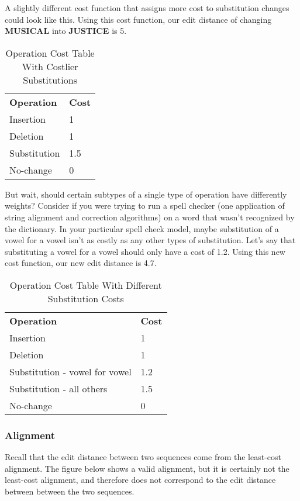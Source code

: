A slightly different cost function that assigns more cost to substitution changes could look like this. Using this cost function, our edit distance of changing \textbf{MUSICAL} into \textbf{JUSTICE} is 5.
\begin{table}[!h]
\centering
\begin{tabular}{ll}
\textbf{Operation} & \textbf{Cost} \\
Insertion          & 1             \\
Deletion           & 1             \\
Substitution       & 1.5             \\
No-change          & 0            
\end{tabular}
\caption{Operation Cost Table With Costlier Substitutions}
\label{tab:naivetable2}
\end{table}

But wait, should certain subtypes of a single type of operation have differently weights? Consider if you were trying to run a spell checker (one application of string alignment and correction algorithms) on a word that wasn't recognized by the dictionary. In your particular spell check model, maybe substitution of a vowel for a vowel isn't as costly as any other types of substitution. Let's say that substituting a vowel for a vowel should only have a cost of 1.2. Using this new cost function, our new edit distance is 4.7.
\begin{table}[!h]
\centering
\begin{tabular}{ll}
\textbf{Operation}             & \textbf{Cost} \\
Insertion                      & 1             \\
Deletion                       & 1             \\
Substitution - vowel for vowel & 1.2           \\
Substitution - all others      & 1.5           \\
No-change                      & 0                
\end{tabular}
\caption{Operation Cost Table With Different Substitution Costs}
\label{my-label3}
\end{table}

\subsubsection{Alignment}

Recall that the edit distance between two sequences come from the least-cost alignment. The figure below shows a valid alignment, but it is certainly not the least-cost alignment, and therefore does not correspond to the edit distance between between the two sequences. 

